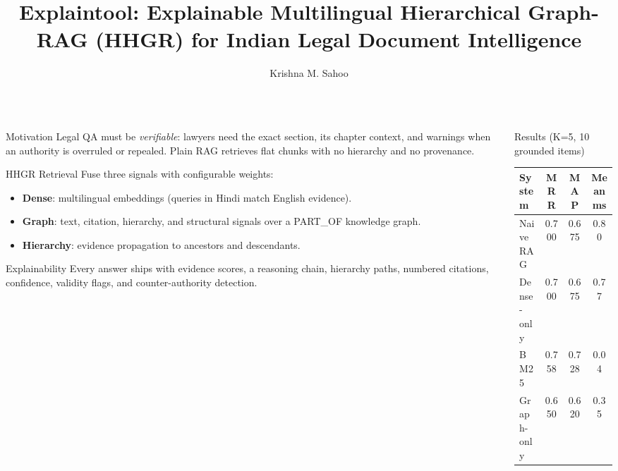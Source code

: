 \documentclass[portrait,fontscale=0.7]{beamer}
\title{Explaintool: Explainable Multilingual Hierarchical Graph-RAG (HHGR)
for Indian Legal Document Intelligence}
\author{Krishna M. Sahoo}
\institute{Explaintool Project}
\begin{document}
\begin{frame}{}
  \maketitle
  \begin{columns}[t]
    \begin{column}{0.48\textwidth}
      \begin{block}{Motivation}
        Legal QA must be \emph{verifiable}: lawyers need the exact section, its
        chapter context, and warnings when an authority is overruled or repealed.
        Plain RAG retrieves flat chunks with no hierarchy and no provenance.
      \end{block}
      \begin{block}{HHGR Retrieval}
        Fuse three signals with configurable weights:
        \begin{itemize}
          \item \textbf{Dense}: multilingual embeddings (queries in Hindi match
                English evidence).
          \item \textbf{Graph}: text, citation, hierarchy, and structural signals
                over a PART\_OF knowledge graph.
          \item \textbf{Hierarchy}: evidence propagation to ancestors and
                descendants.
        \end{itemize}
      \end{block}
      \begin{block}{Explainability}
        Every answer ships with evidence scores, a reasoning chain, hierarchy
        paths, numbered citations, confidence, validity flags, and
        counter-authority detection.
      \end{block}
    \end{column}
    \begin{column}{0.48\textwidth}
      \begin{block}{Results (K=5, 10 grounded items)}
        \begin{center}
        \begin{tabular}{lccc}
          \textbf{System} & \textbf{MRR} & \textbf{MAP} & \textbf{Mean ms}\\
          \hline
          Naive RAG & 0.700 & 0.675 & 0.80\\
          Dense-only & 0.700 & 0.675 & 0.77\\
          BM25 & 0.758 & 0.728 & 0.04\\
          Graph-only & 0.650 & 0.620 & 0.35\\

\end{tabular}
\end{center}
\end{block}
\end{column}
\end{columns}
\end{frame}
\end{document}
